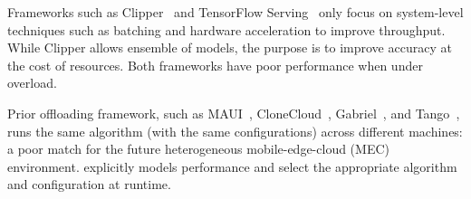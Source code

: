 




 Frameworks such as Clipper~\cite{crankshaw2017clipper} and
TensorFlow Serving~\cite{tensorflow2017serving} only focus on system-level
techniques such as batching and hardware acceleration to improve
throughput. While Clipper allows ensemble of models, the purpose is to improve
accuracy at the cost of resources. Both frameworks have poor performance when
under overload.

 Prior offloading framework, such as
MAUI~\cite{cuervo2010maui}, CloneCloud~\cite{chun2011clonecloud},
Gabriel~\cite{ha2014towards}, and Tango~\cite{gordon2015accelerating}, runs the
same algorithm (with the same configurations) across different machines: a poor
match for the future heterogeneous mobile-edge-cloud (MEC)
environment. \sysname{} explicitly models performance and select the appropriate
algorithm and configuration at runtime.

